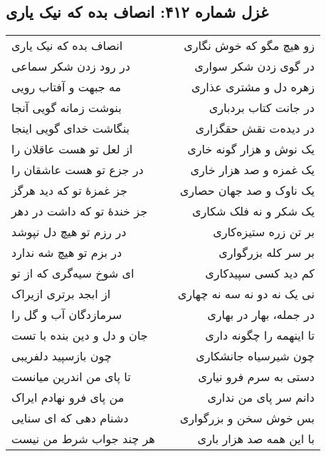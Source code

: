\begin{center}
\section*{غزل شماره ۴۱۲: انصاف بده که نیک یاری}
\label{sec:412}
\begin{longtable}{l p{0.5cm} r}
انصاف بده که نیک یاری
&&
زو هیچ مگو که خوش نگاری
\\
در رود زدن شکر سماعی
&&
در گوی زدن شکر سواری
\\
مه جبهت و آفتاب رویی
&&
زهره دل و مشتری عذاری
\\
بنوشت زمانه گویی آنجا
&&
در جانت کتاب بردباری
\\
بنگاشت خدای گویی اینجا
&&
در دیده‌ت نقش حقگزاری
\\
از لعل تو هست عاقلان را
&&
یک نوش و هزار گونه خاری
\\
در جزع تو هست عاشقان را
&&
یک غمزه و صد هزار خاری
\\
جز غمزهٔ تو که دید هرگز
&&
یک ناوک و صد جهان حصاری
\\
جز خندهٔ تو که داشت در دهر
&&
یک شکر و نه فلک شکاری
\\
در رزم تو هیچ دل نپوشد
&&
بر تن زره ستیزه‌کاری
\\
در بزم تو هیچ شه ندارد
&&
بر سر کله بزرگواری
\\
ای شوخ سیه‌گری که از تو
&&
کم دید کسی سپیدکاری
\\
از ابجد برتری ازیراک
&&
نی یک نه دو نه سه نه چهاری
\\
سرمازدگان آب و گل را
&&
در جمله، بهار در بهاری
\\
جان و دل و دین بنده با تست
&&
تا اینهمه را چگونه داری
\\
چون بازسپید دلفریبی
&&
چون شیرسیاه جانشکاری
\\
تا پای من اندرین میانست
&&
دستی به سرم فرو نیاری
\\
من پای فرو نهادم ایراک
&&
دانم سر پای من نداری
\\
دشنام دهی که ای سنایی
&&
بس خوش سخن و بزرگواری
\\
هر چند جواب شرط من نیست
&&
با این همه صد هزار باری
\\
\end{longtable}
\end{center}
